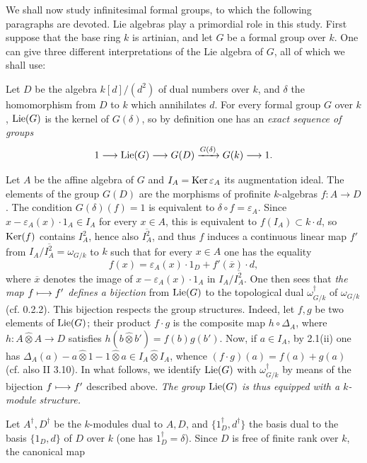 We shall now study infinitesimal formal groups, to which the following paragraphs are devoted. Lie algebras play a primordial role in this study.
First suppose that the base ring $k$ is artinian, and let $G$ be a formal group over $k$. One can give three different interpretations of the Lie algebra of $G$, all of which we shall use:
\begin{enumeratea}
\item Let $D$ be the algebra $k[d]/(d^2)$ of dual numbers over $k$, and $\delta$ the homomorphism from $D$ to $k$ which annihilates $d$. For every formal group $G$ over $k$, $\operatorname{Lie}(G)$ is the kernel of $G(\delta)$, so by definition one has an \emph{exact sequence of groups}
\[
1\longrightarrow\operatorname{Lie}(G)\longrightarrow G(D)\xrightarrow{G(\delta)}G(k)\longrightarrow1.
\]
\item Let $A$ be the affine algebra of $G$ and $I_A=\operatorname{Ker}\varepsilon_A$ its augmentation ideal. The elements of the group $G(D)$ are the morphisms of profinite $k$-algebras $f:A\to D$. The condition $G(\delta)(f)=1$ is equivalent to $\delta\circ f=\varepsilon_A$. Since $x-\varepsilon_A(x)\cdot1_A\in I_A$ for every $x\in A$, this is equivalent to $f(I_A)\subset k\cdot d$, so $\operatorname{Ker}(f)$ contains $I_A^2$, hence also $\overline{I_A^2}$, and thus $f$ induces a continuous linear map $f'$ from $I_A/\overline{I_A^2}=\omega_{G/k}$ to $k$ such that for every $x\in A$ one has the equality
\[
f(x)=\varepsilon_A(x)\cdot1_D+f'(\overline x)\cdot d,
\]
where $\overline x$ denotes the image of $x-\varepsilon_A(x)\cdot1_A$ in $I_A/\overline{I_A^2}$. One then sees that \emph{the map $f\longmapsto f'$ defines a bijection} from $\operatorname{Lie}(G)$ to the topological dual $\omega_{G/k}^\dagger$ of $\omega_{G/k}$ (cf. 0.2.2).
This bijection respects the group structures. Indeed, let $f,g$ be two elements of $\operatorname{Lie}(G)$; their product $f\cdot g$ is the composite map $h\circ\Delta_A$, where $h:A\widehat\otimes A\to D$ satisfies $h(b\widehat\otimes b')=f(b)g(b')$. Now, if $a\in I_A$, by 2.1(ii) one has $\Delta_A(a)-a\widehat\otimes1-1\widehat\otimes a\in I_A\widehat\otimes I_A$, whence $(f\cdot g)(a)=f(a)+g(a)$ (cf. also II 3.10).
In what follows, we identify $\operatorname{Lie}(G)$ with $\omega_{G/k}^\dagger$ by means of the bijection $f\longmapsto f'$ described above. \emph{The group $\operatorname{Lie}(G)$ is thus equipped with a $k$-module structure.}
\item Let $A^\dagger,D^\dagger$ be the $k$-modules dual to $A,D$, and $\{1_D^\dagger,d^\dagger\}$ the basis dual to the basis $\{1_D,d\}$ of $D$ over $k$ (one has $1_D^\dagger=\delta$). Since $D$ is free of finite rank over $k$, the canonical map

\end{enumeratea}
